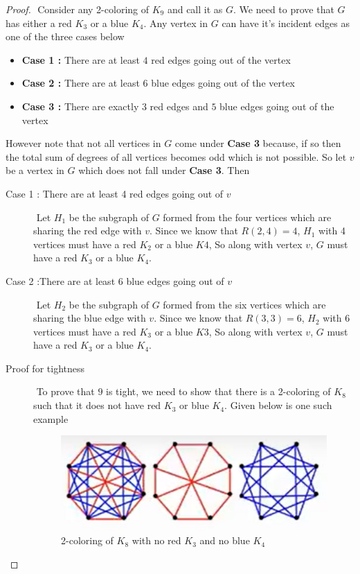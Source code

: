  \begin{proof}
 $ $
 Consider any 2-coloring of $K_9$ and call it as $G$. We need to prove that $G$ has either a red $K_3$ or a blue $K_4$. Any vertex in $G$ can have it's incident edges as one of the three cases below
  \begin{itemize}
  \item \textbf{Case 1 : }There are at least $4$ red edges going out of the vertex
  \item \textbf{Case 2 : }There are at least $6$ blue edges going out of the vertex
  \item \textbf{Case 3 : }There are exactly $3$ red edges and $5$ blue edges going out of the vertex
  \end{itemize}
 However note that not all vertices in $G$ come under \textbf{Case 3} because, if so then the total sum of degrees of all vertices becomes odd which is not possible. So let $v$ be a vertex in $G$ which does not fall under \textbf{Case 3}. Then
 \begin{description}
    \item[Case 1 : There are at least 4 red edges going out of $v$ ]
    $ $ \newline
    Let $H_1$ be the subgraph of $G$ formed from the four vertices which are sharing the red edge with $v$.  Since we know that $R(2,4)=4$, $H_1$ with 4 vertices must have a red $K_2$ or a blue $K4$, So along with vertex $v$, $G$ must have a red $K_3$ or a blue $K_4$.
    \item[Case 2 :There are at least 6 blue edges going out of $v$]
    $ $ \newline
    Let $H_2$ be the subgraph of $G$ formed from the six vertices which are sharing the blue edge with $v$. Since we know that $R(3,3)=6$, $H_2$ with 6 vertices must have a red $K_3$ or a blue $K3$, So along with vertex $v$, $G$ must have a red $K_3$ or a blue $K_4$.
    \item[Proof for tightness]
    $ $ \newline
    To prove that $9$ is tight, we need to show that there is a 2-coloring of $K_8$ such that it does not have red $K_3$ or blue $K_4$. Given below is one such  example
\begin{figure}[h!]
    \centering
    \includegraphics[width=0.5\linewidth]{images/R34counter_example.png}
    \caption{2-coloring of $K_8$ with no red $K_3$ and no blue $K_4$}
\end{figure}
 \end{description}
  
 \end{proof}
